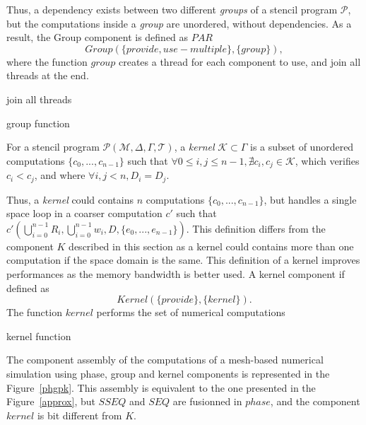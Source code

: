 Thus, a dependency exists between two different \emph{groups} of a stencil program $\mathcal{P}$, but the computations inside a \emph{group} are unordered, without dependencies. As a result, the Group component is defined as $PAR$
\begin{equation}
Group(\{provide,use-multiple\},\{group\}),
\end{equation}
 where the function $group$ creates a thread for each component to use, and join all threads at the end.

\begin{algorithm}[H]
 join all threads
 \label{alg:par}
 \caption{group function}
 \end{algorithm}

\begin{mydef}
For a stencil program $\mathcal{P}(\mathcal{M},\Delta,\Gamma,\mathcal{T})$, a \emph{kernel} $\mathcal{K} \subset \Gamma$ is a subset of unordered computations $\{c_0,...,c_{n-1}\}$ such that $\forall 0 \leq i,j \leq n-1, \nexists c_i,c_j \in \mathcal{K}$, which verifies $c_i<c_j$, and where $\forall i,j<n, D_i=D_j$.
\end{mydef}

\medskip
Thus, a \emph{kernel} could contains $n$ computations $\{c_0,...,c_{n-1}\}$, but handles a single space loop in a coarser computation $c'$ such that $c'(\bigcup_{i=0}^{n-1}R_i,\bigcup_{i=0}^{n-1}w_i,D,\{e_0,...,e_{n-1}\})$. This definition differs from the component $K$ described in this section as a kernel could contains more than one computation if the space domain is the same. This definition of a kernel improves performances as the memory bandwidth is better used. A kernel component if defined as
\begin{equation}
Kernel(\{provide\},\{kernel\}).
\end{equation}
 The function $kernel$ performs the set of numerical computations

\begin{algorithm}[H]
 \caption{kernel function}
 \end{algorithm}

\medskip
The component assembly of the computations of a mesh-based numerical simulation using phase, group and kernel components is represented in the Figure~\ref{phgpk}. This assembly is equivalent to the one presented in the Figure~\ref{approx}, but $SSEQ$ and $SEQ$ are fusionned in $phase$, and the component $kernel$ is bit different from $K$.

